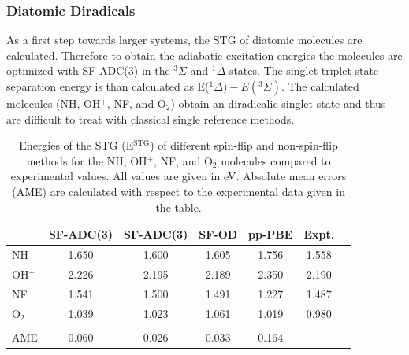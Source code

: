 \documentclass[aip,graphicx,amsmath,reprint]{revtex4-1}
\begin{document}
\subsubsection{Diatomic Diradicals}
As a first step towards larger systems, the STG of diatomic molecules are calculated. Therefore to obtain the adiabatic excitation energies the molecules are optimized with SF-ADC(3) in the $^3\Sigma$ and $^1\Delta$ states. The singlet-triplet state separation energy is than calculated as E($^1\Delta)-E(^3\Sigma)$. The calculated molecules (NH, OH$^+$, NF, and O$_2$) obtain an diradicalic singlet state and thus are difficult to treat with classical single reference methods.

\begin{table}
\caption{\label{tab:diatom}Energies of the STG (E$^{{\text{STG}}}$) of different spin-flip and non-spin-flip methods for the NH, OH$^+$, NF, and O$_2$ molecules compared to experimental values. All values are given in eV. Absolute mean errors (AME) are calculated with respect to the experimental data given in the table.}
\begin{ruledtabular}
\begin{tabular}{lcccccc}
& SF-ADC(3)\footnotemark[1] & SF-ADC(3)\footnotemark[2] & SF-OD\footnotemark[3] & pp-PBE\footnotemark[4]& Expt.\footnotemark[5]\\
\hline
NH&1.650&1.600&1.605&1.756&1.558\\
OH$^+$&2.226&2.195&2.189&2.350&2.190\\
NF&1.541&1.500&1.491&1.227&1.487\\
O$_2$&1.039&1.023&1.061&1.019&0.980\\
&&&&&\\
AME&0.060&0.026&0.033&0.164&\\
\end{tabular}
\end{ruledtabular}
\end{table}
\end{document}
